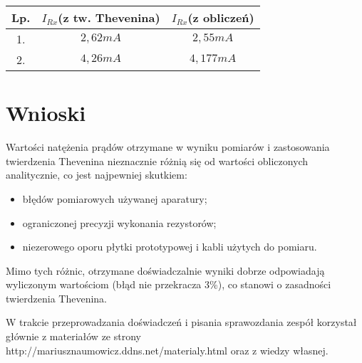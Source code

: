 \documentclass[polish,a4paper]{article}
\begin{document}
\begin{center}
\begin{tabular}{|c|c|c|}
\hline
\textbf{Lp.} & \textbf{$I_{Rx}$(z tw. Thevenina)} & \textbf{$I_{Rx}$(z obliczeń)}\\
\hline
1. & $2,62mA$ & $2,55mA$\\
\hline %
2. & $4,26mA$ & $4,177mA$\\
\hline
\end{tabular}
\end{center}

\section{Wnioski}

Wartości natężenia prądów otrzymane w wyniku pomiarów i zastosowania twierdzenia Thevenina nieznacznie różnią się od wartości obliczonych analitycznie, 
co jest najpewniej skutkiem:
\begin{itemize}
\item błędów pomiarowych używanej aparatury;
\item ograniczonej precyzji wykonania rezystorów;
\item niezerowego oporu płytki prototypowej i kabli użytych do pomiaru.
\end{itemize}

\begin{flushleft}
Mimo tych różnic, otrzymane doświadczalnie wyniki dobrze odpowiadają wyliczonym wartościom (błąd nie przekracza 3\%), co
stanowi o zasadności twierdzenia Thevenina.
\end{flushleft}




\begin{thebibliography}{9}

  W trakcie przeprowadzania doświadczeń i pisania sprawozdania zespół korzystał głównie z materiałów ze strony http://mariusznaumowicz.ddns.net/materialy.html oraz z wiedzy własnej.

\end{thebibliography}
\end{document}
